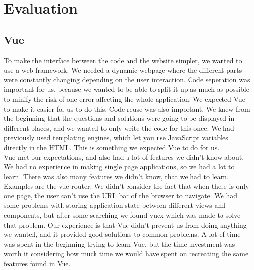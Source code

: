 \section{Evaluation}
\subsection{Vue}
To make the interface between the code and the website simpler, we wanted to use a web framework. We needed a dynamic webpage where the different parts were constantly changing depending on the user interaction. Code seperation was important for us, because we wanted to be able to split it up as much as possible to minify the risk of one error affecting the whole application. We expected Vue to make it easier for us to do this. Code reuse was also important. We knew from the beginning that the questions and solutions were going to be displayed in different places, and we wanted to only write the code for this once. We had previously used templating engines, which let you use JavaScript variables directly in the HTML. This is something we expected Vue to do for us.
\\[11pt]
Vue met our expectations, and also had a lot of features we didn't know about. We had no experience in making single page applications, so we had a lot to learn. There was also many features we didn't know, that we had to learn. Examples are the vue-router. We didn't consider the fact that when there is only one page, the user can't use the URL bar of the browser to navigate. We had some problems with storing application state between different views and components, but after some searching we found vuex which was made to solve that problem. Our experience is that Vue didn't prevent us from doing anything we wanted, and it provided good solutions to common problems. A lot of time was spent in the beginning trying to learn Vue, but the time investment was worth it considering how much time we would have spent on recreating the same features found in Vue.